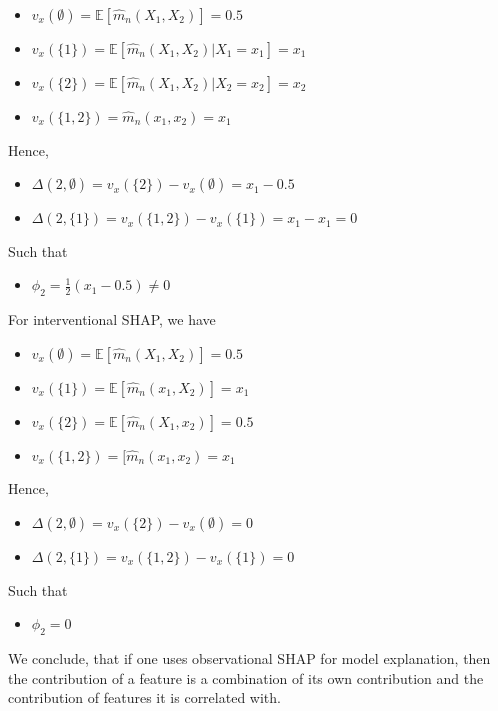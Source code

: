 \documentclass[
]{book}
\providecommand{\tightlist}{%
  \setlength{\itemsep}{0pt}\setlength{\parskip}{0pt}}
\begin{document}
\begin{itemize}
\tightlist
\item
  \(v_x (\emptyset)=\mathbb E[\hat m_n(X_1,X_2) ]=0.5\)
\item
  \(v_x (\{1\})=\mathbb E[\hat m_n(X_1,X_2) |X_1=x_1 ]=x_1\)
\item
  \(v_x (\{2\})=\mathbb E[\hat m_n(X_1,X_2) |X_2=x_2 ]=x_2\)
\item
  \(v_x (\{1,2\})=\hat m_n(x_1,x_2) =x_1\)
\end{itemize}

Hence,

\begin{itemize}
\tightlist
\item
  \(\Delta(2,\emptyset)= v_x (\{2\})-v_x (\emptyset)=x_1-0.5\)
\item
  \(\Delta(2,\{1\})= v_x (\{1,2\})-v_x (\{1\})=x_1-x_1=0\)
\end{itemize}

Such that

\begin{itemize}
\tightlist
\item
  \(\phi_2= \frac 1 2 (x_1-0.5)\neq 0\)
\end{itemize}

For interventional SHAP, we have

\begin{itemize}
\tightlist
\item
  \(v_x (\emptyset)=\mathbb E[\hat m_n(X_1,X_2) ]=0.5\)
\item
  \(v_x (\{1\})=\mathbb E[\hat m_n(x_1,X_2) ]=x_1\)
\item
  \(v_x (\{2\})=\mathbb E[\hat m_n(X_1,x_2) ]=0.5\)
\item
  \(v_x (\{1,2\})=[\hat m_n(x_1,x_2) =x_1\)
\end{itemize}

Hence,

\begin{itemize}
\tightlist
\item
  \(\Delta(2,\emptyset)= v_x (\{2\})-v_x (\emptyset)=0\)
\item
  \(\Delta(2,\{1\})= v_x (\{1,2\})-v_x (\{1\})=0\)
\end{itemize}

Such that

\begin{itemize}
\tightlist
\item
  \(\phi_2= 0\)
\end{itemize}

We conclude, that if one uses observational SHAP for model explanation, then the contribution of a feature is a combination of its own contribution and the contribution of features it is correlated with.
\end{document}
